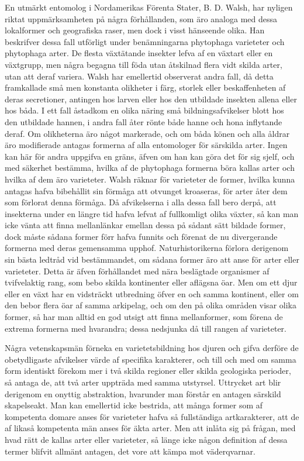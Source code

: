 En utmärkt entomolog i Nordamerikas Förenta Stater, B. D. Walsh, har nyligen riktat uppmärksamheten på några förhållanden, som äro analoga med dessa lokalformer och geografiska raser, men dock i visst hänseende olika. Han beskrifver dessa fall utförligt under benämningarna phytophaga varieteter och phytophaga arter. De flesta växtätande insekter lefva af en växtart eller en växtgrupp, men några begagna till föda utan åtskilnad flera vidt skilda arter, utan att deraf variera. Walsh har emellertid observerat andra fall, då detta framkallade små men konstanta olikheter i färg, storlek eller beskaffenheten af deras secretioner, antingen hos larven eller hos den utbildade insekten allena eller hos båda. I ett fall åstadkom en olika näring små bildningsafvikelser blott hos den utbildade hannen, i andra fall åter rönte både hanne och hona inflytande deraf. Om olikheterna äro något markerade, och om båda könen och alla åldrar äro modifierade antagas formerna af alla entomologer för särskilda arter. Ingen kan här för andra uppgifva en gräns, äfven om han kan göra det för sig sjelf, och med säkerhet bestämma, hvilka af de phytophaga formerna böra kallas arter och hvilka af dem äro varieteter. Walsh räknar för varieteter de former, hvilka kunna antagas hafva bibehållit sin förmåga att otvunget kroaseras, för arter åter dem som förlorat denna förmåga. Då afvikelserna i alla dessa fall bero derpå, att insekterna under en längre tid hafva lefvat af fullkomligt olika växter, så kan man icke vänta att finna mellanlänkar emellan dessa på sådant sätt bildade former, dock måste sådana former förr hafva funnits och förenat de nu divergerande formerna med deras gemensamma upphof. Naturhistorikerna förlora derigenom sin bästa ledtråd vid bestämmandet, om sådana former äro att anse för arter eller varieteter. Detta är äfven förhållandet med nära beslägtade organismer af tvifvelaktig rang, som bebo skilda kontinenter eller aflägsna öar. Men om ett djur eller en växt har en vidsträckt utbredning öfver en och samma kontinent, eller om den bebor flera öar af samma arkipelag, och om den på olika områden visar olika former, så har man alltid en god utsigt att finna mellanformer, som förena de extrema formerna med hvarandra; dessa nedsjunka då till rangen af varieteter.

Några vetenskapsmän förneka en varietetsbildning hos djuren och gifva derföre de obetydligaste afvikelser värde af specifika karakterer, och till och med om samma form identiskt förekom mer i två skilda regioner eller skilda geologiska perioder, så antaga de, att två arter uppträda med samma utstyrsel. Uttrycket art blir derigenom en onyttig abstraktion, hvarunder man förstår en antagen särskild skapelseakt. Man kan emellertid icke bestrida, att många former som af kompetenta domare anses för varieteter hafva så fullständiga artkarakterer, att de af likaså kompetenta män anses för äkta arter. Men att inlåta sig på frågan, med hvad rätt de kallas arter eller varieteter, så länge icke någon definition af dessa termer blifvit allmänt antagen, det vore att kämpa mot väderqvarnar.

